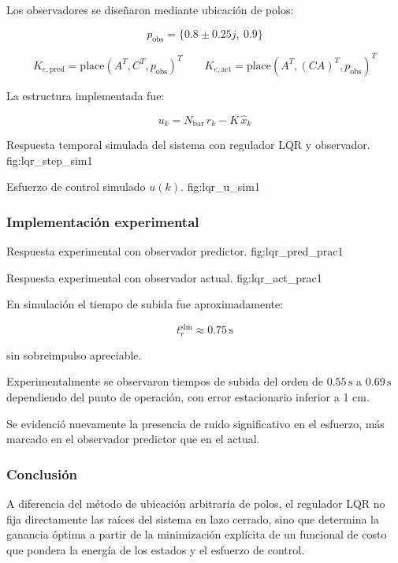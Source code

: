 Los observadores se diseñaron mediante ubicación de polos:

\[
p_{\mathrm{obs}}=\{0.8\pm 0.25j,\ 0.9\}
\]

\[
K_{e,\mathrm{pred}}=\mathrm{place}(A^T,C^T,p_{\mathrm{obs}})^T
\qquad
K_{e,\mathrm{act}}=\mathrm{place}(A^T,(CA)^T,p_{\mathrm{obs}})^T
\]

La estructura implementada fue:

\[
u_k = N_{\mathrm{bar}}\,r_k - K\,\hat{x}_k
\]

{Respuesta temporal simulada del sistema con regulador LQR y observador.}
{fig:lqr_step_sim}{1}

{Esfuerzo de control simulado $u(k)$.}
{fig:lqr_u_sim}{1}

\subsubsection{Implementación experimental}

{Respuesta experimental con observador predictor.}
{fig:lqr_pred_prac}{1}

{Respuesta experimental con observador actual.}
{fig:lqr_act_prac}{1}

En simulación el tiempo de subida fue aproximadamente:

\[
t_r^{\text{sim}} \approx 0.75\,\text{s}
\]

sin sobreimpulso apreciable.

Experimentalmente se observaron tiempos de subida del orden de
\(0.55\,\text{s}\) a \(0.69\,\text{s}\) dependiendo del punto de operación,
con error estacionario inferior a 1 cm.

Se evidenció nuevamente la presencia de ruido significativo en el esfuerzo,
más marcado en el observador predictor que en el actual.

\subsubsection{Conclusión}

A diferencia del método de ubicación arbitraria de polos, el regulador LQR
no fija directamente las raíces del sistema en lazo cerrado, sino que
determina la ganancia óptima a partir de la minimización explícita de un
funcional de costo que pondera la energía de los estados y el esfuerzo
de control.


